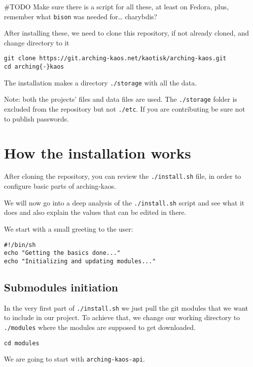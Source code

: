 \documentclass[12pt]{report}
\begin{document}
\#TODO Make sure there is a script for all these, at least on Fedora,
plus, remember what \texttt{bison} was needed for\ldots{} charybdis?

After installing these, we need to clone this repository, if not already
cloned, and change directory to it

\begin{verbatim}
git clone https://git.arching-kaos.net/kaotisk/arching-kaos.git
cd arching{-}kaos
\end{verbatim}

The installation makes a directory \texttt{./storage} with all the data.

Note: both the projects' files and data files are used. The
\texttt{./storage} folder is excluded from the repository but not
\texttt{./etc}. If you are contributing be sure not to publish
passwords.


\section{How the installation
works}\label{how-the-installation-works}

After cloning the repository, you can review the \texttt{./install.sh}
file, in order to configure basic parts of arching-kaos.

We will now go into a deep analysis of the \texttt{./install.sh} script
and see what it does and also explain the values that can be edited in
there.

We start with a small greeting to the user:

\begin{verbatim}
#!/bin/sh
echo "Getting the basics done..."
echo "Initializing and updating modules..."
\end{verbatim}


\subsection{Submodules initiation}\label{submodules-initiation}

In the very first part of \texttt{./install.sh} we just pull the git
modules that we want to include in our project. To achieve that, we
change our working directory to \texttt{./modules} where the modules are
supposed to get downloaded.

\begin{verbatim}
cd modules
\end{verbatim}

We are going to start with \texttt{arching-kaos-api}.
\end{document}
